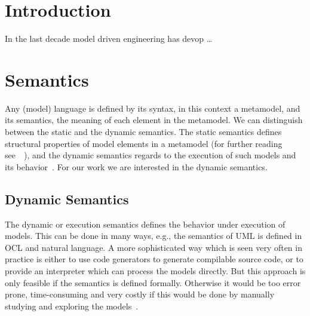 \documentclass{llncs}
\begin{document}
\tableofcontents
\newpage


\section{Introduction}
In the last decade model driven engineering has devop  \dots


\section{Semantics}
Any (model) language is defined by its syntax, in this context a metamodel, and its semantics, the meaning of each element in the metamodel. We can distinguish between the static and the dynamic semantics. The static semantics defines structural properties of model elements in a metamodel (for further reading see~\cite{jour:10}~\cite{jour:3}), and the dynamic semantics regards to the execution of such models and its behavior~\cite{jour:3}. For our work we are interested in the dynamic semantics.

\subsection{Dynamic Semantics}
The dynamic or execution semantics defines the behavior under execution of models. This can be done in many ways, e.g., the semantics of UML is defined in OCL and natural language. A more sophisticated way which is seen very often in practice is either to use code generators to generate compilable source code, or to provide an interpreter which can process the models directly. But this approach is only feasible if the semantics is defined formally. Otherwise it would be too error prone, time-consuming and very costly if this would be done by manually studying and exploring the models~\cite{jour:3}.
\end{document}
